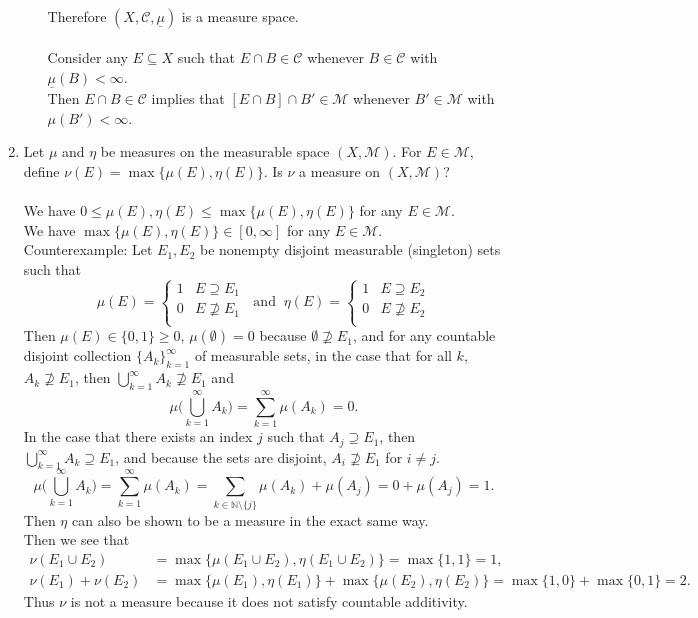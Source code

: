 \begin{enumerate}
\begin{enumerate}[label=(\roman*),align=left]
		\\Therefore $(X,\mathcal{C},\underline\mu)$ is a measure space.\\
		\\Consider any $E\subseteq X$ such that $E\cap B\in\mathcal{C}$ whenever $B\in\mathcal{C}$ with $\underline\mu(B)<\infty$.
		\\Then $E\cap B\in\mathcal{C}$ implies that $[E\cap B]\cap B'\in\mathcal{M}$ whenever $B'\in\mathcal{M}$ with $\mu(B')<\infty$.
	\end{enumerate}
	\item Let $\mu$ and $\eta$ be measures on the measurable space $(X,\mathcal{M})$.
	For $E\in\mathcal{M}$, define $\nu(E)=\max\{\mu(E),\eta(E)\}$. Is $\nu$ a measure on $(X,\mathcal{M})$?\\
	\\We have $0\le\mu(E),\eta(E)\le\max\{\mu(E),\eta(E)\}$ for any $E\in\mathcal{M}$.
	\\We have $\max\{\mu(E),\eta(E)\}\in[0,\infty]$ for any $E\in\mathcal{M}$.
	\\Counterexample:
	Let $E_1,E_2$ be nonempty disjoint measurable (singleton) sets such that
	\[
		\mu(E)=
		\begin{cases}
			1&E\supseteq E_1\\
			0&E\not\supseteq E_1\\
		\end{cases}
		\ \text{ and }\ \eta(E)=
		\begin{cases}
			1&E\supseteq E_2\\
			0&E\not\supseteq E_2\\
		\end{cases}
	\]
	Then $\mu(E)\in\{0,1\}\ge0$, $\mu(\emptyset)=0$ because $\emptyset\not\supseteq E_1$, and for any countable disjoint collection $\{A_k\}_{k=1}^\infty$ of measurable sets,
	in the case that for all $k$, $A_k\not\supseteq E_1$, then $\bigcup_{k=1}^\infty A_k\not\supseteq E_1$ and 
	\[
		\mu\biggl(\bigcup_{k=1}^\infty A_k\biggr)=\sum_{k=1}^\infty\mu(A_k)=0.
	\]
	In the case that there exists an index $j$ such that $A_j\supseteq E_1$, then $\bigcup_{k=1}^\infty A_k\supseteq E_1$, and because the sets are disjoint, $A_i\not\supseteq E_1$ for $i\neq j$.
	\[
		\mu\biggl(\bigcup_{k=1}^\infty A_k\biggr)=\sum_{k=1}^\infty\mu(A_k)=\sum_{k\in\mathbb{N}\setminus\{j\}}\mu(A_k)+\mu(A_j)=0+\mu(A_j)=1.
	\]
	Then $\eta$ can also be shown to be a measure in the exact same way.
	\\Then we see that
	\begin{align*}
		\nu(E_1\cup E_2)&=\max\{\mu(E_1\cup E_2),\eta(E_1\cup E_2)\}=\max\{1,1\}=1,\\
		\nu(E_1)+\nu(E_2)&=\max\{\mu(E_1),\eta(E_1)\}+\max\{\mu(E_2),\eta(E_2)\}=\max\{1,0\}+\max\{0,1\}=2.
	\end{align*}
	Thus $\nu$ is not a measure because it does not satisfy countable additivity.
\end{enumerate}

